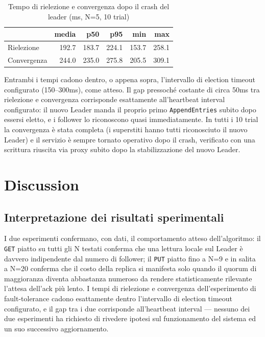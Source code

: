 \documentclass[conference]{IEEEtran}
\begin{document}
\begin{table}[H]
\centering
\caption{Tempo di rielezione e convergenza dopo il crash del leader (ms, N=5, 10 trial)}
\label{tab:fault-tolerance}
\begin{tabular}{@{}lrrrrr@{}}
\toprule
 & media & p50 & p95 & min & max \\
\midrule
Rielezione  & 192.7 & 183.7 & 224.1 & 153.7 & 258.1 \\
Convergenza & 244.0 & 235.0 & 275.8 & 205.5 & 309.1 \\
\bottomrule
\end{tabular}
\end{table}

Entrambi i tempi cadono dentro, o appena sopra, l'intervallo di election
timeout configurato (150--300ms), come atteso. Il gap pressoché costante
di circa 50ms tra rielezione e convergenza corrisponde esattamente
all'heartbeat interval configurato: il nuovo Leader manda il proprio primo
\texttt{AppendEntries} subito dopo essersi eletto, e i follower lo
riconoscono quasi immediatamente. In tutti i 10 trial la convergenza è
stata completa (i superstiti hanno tutti riconosciuto il nuovo Leader) e
il servizio è sempre tornato operativo dopo il crash, verificato con una
scrittura riuscita via proxy subito dopo la stabilizzazione del nuovo
Leader.

\section{Discussion}
\label{sec:discussion}

\subsection{Interpretazione dei risultati sperimentali}

I due esperimenti confermano, con dati, il comportamento atteso
dell'algoritmo: il \texttt{GET} piatto su tutti
gli N testati conferma che una lettura locale sul Leader è davvero
indipendente dal numero di follower; il \texttt{PUT} piatto fino a N=9 e
in salita a N=20 conferma che il costo della replica si manifesta solo
quando il quorum di maggioranza diventa abbastanza numeroso da rendere
statisticamente rilevante l'attesa dell'ack più lento. I tempi di
rielezione e convergenza dell'esperimento di fault-tolerance cadono
esattamente dentro l'intervallo di election timeout configurato, e il
gap tra i due corrisponde all'heartbeat interval — nessuno dei due
esperimenti ha richiesto di rivedere ipotesi sul funzionamento del
sistema ed un suo successivo aggiornamento.
\end{document}
